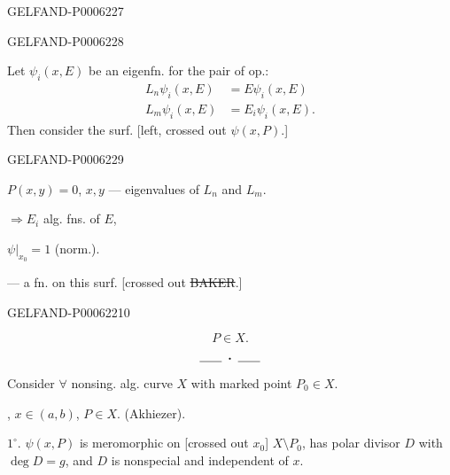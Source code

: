 \begin{GelfandAdjacentEvidence}{GELFAND-P000622}{7}

\end{GelfandAdjacentEvidence}
\begin{GelfandAdjacentEvidence}{GELFAND-P000622}{8}

Let \(\psi_i(x,E)\) be an eigenfn. for the pair of op.:
\[
\begin{aligned}
L_n\psi_i(x,E)&=E\psi_i(x,E)\\
L_m\psi_i(x,E)&=E_i\psi_i(x,E).
\end{aligned}
\]
Then consider the surf.
[left, crossed out \sout{\(\psi(x,P)\)}.]
\end{GelfandAdjacentEvidence}
\begin{GelfandAdjacentEvidence}{GELFAND-P000622}{9}

\begin{center}
\uline{\(P(x,y)=0\)}, \quad \(x,y\) — eigenvalues of \(L_n\) and \(L_m\).
\end{center}
\(\Rightarrow E_i\) alg. fns. of \(E\),

\begin{flushright}
\(\psi|_{x_0}=1\) (norm.).
\end{flushright}
 — a fn. on this surf. [crossed out \sout{BAKER}.]
\end{GelfandAdjacentEvidence}
\begin{GelfandAdjacentEvidence}{GELFAND-P000622}{10}

\[
P\in X.
\]
\[\rule{1.8em}{.4pt}\;\boldsymbol{\cdot}\;\rule{1.8em}{.4pt}\]
Consider \(\forall\) nonsing. alg. curve \(X\) with marked point \(P_0\in X\).

, \(x\in(a,b)\),
\(P\in X\). (Akhiezer).

\(1^\circ\). \(\psi(x,P)\) is meromorphic on [crossed out \sout{\(x_0\)}]
\(X\setminus P_0\),
has polar divisor \(D\) with \(\deg D=g\), and \(D\) is nonspecial and independent of \(x\).
\end{GelfandAdjacentEvidence}
